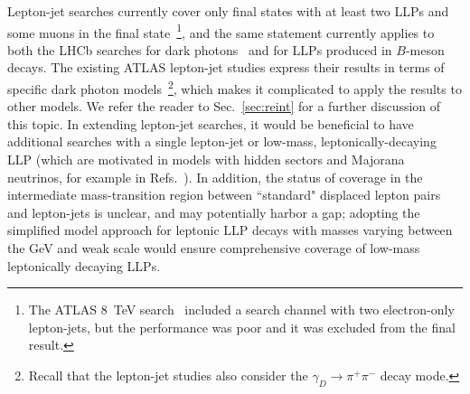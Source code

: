 Lepton-jet searches currently cover only final states with at least two LLPs and some muons in the final state~\footnote{The ATLAS 8~TeV search~\cite{Aad:2014yea} included a search channel with two electron-only lepton-jets, but the performance was poor and it was excluded from the final result.}, and the same statement currently applies to both the LHCb searches for dark photons~\cite{Aaij:2016rxn,Aaij:2017rft} and for LLPs produced in $B$-meson decays. The existing ATLAS lepton-jet studies express their results in terms of specific dark photon models~\footnote{Recall that the lepton-jet studies also consider the $\gamma_D \to \pi^+ \pi^-$ decay mode.}, which makes it complicated to apply the results to other models. We refer the reader to Sec.~\ref{sec:reint} for a further discussion of this topic. In extending lepton-jet searches, it would be beneficial to have additional searches with a single lepton-jet or low-mass, leptonically-decaying LLP (which are motivated in models with hidden sectors and Majorana neutrinos, for example in Refs.~\cite{Izaguirre:2015pga,Izaguirre:2015zva}). In addition, the status of coverage in the intermediate mass-transition region between ``standard" displaced lepton pairs and lepton-jets is unclear, and may potentially harbor a gap; adopting the simplified model approach for leptonic LLP decays with masses varying between the GeV and weak scale would ensure comprehensive coverage of low-mass leptonically decaying LLPs.

